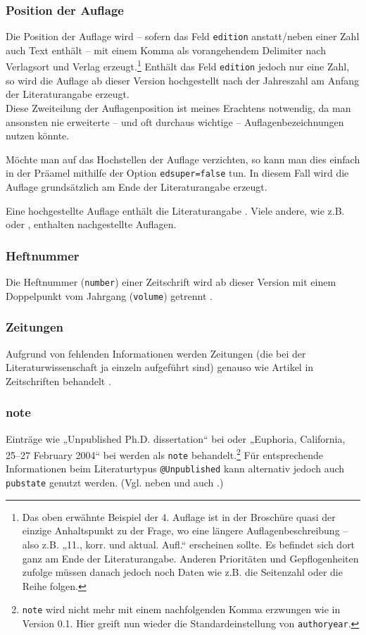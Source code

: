\documentclass[12pt,notitlepage,parskip]{scrartcl}
\begin{document}
\subsubsection{Position der Auflage}
Die Position der Auflage wird – sofern das Feld \texttt{edition} anstatt/neben
einer Zahl auch Text enthält – mit einem Komma als vorangehendem Delimiter nach
Verlagsort und Verlag erzeugt.\footnote{Das oben erwähnte Beispiel der 4.
Auflage ist in der Broschüre quasi der einzige Anhaltspunkt zu der Frage, wo
eine längere Auflagenbeschreibung – also z.B. „11., korr. und aktual. Aufl.“
erscheinen sollte. Es befindet sich dort ganz am Ende der Literaturangabe.
Anderen Prioritäten und Gepflogenheiten zufolge müssen danach jedoch noch Daten
wie z.B. die Seitenzahl oder die Reihe folgen.} Enthält das Feld
\texttt{edition} jedoch nur eine Zahl, so wird die Auflage ab dieser Version
hochgestellt nach der Jahreszahl am Anfang der Literaturangabe erzeugt.\\
Diese Zweiteilung der Auflagenposition ist meines Erachtens notwendig, da man
ansonsten nie erweiterte – und oft durchaus wichtige – Auflagenbezeichnungen
nutzen könnte.

Möchte man auf das Hochstellen der Auflage verzichten, so kann man dies
einfach in der Präamel mithilfe der Option \texttt{edsuper=false} tun. In diesem
Fall wird die Auflage grundsätzlich am Ende der Literaturangabe erzeugt.

Eine hochgestellte Auflage enthält die Literaturangabe \textcite{greule}. Viele
andere, wie z.B. \textcite{nt} oder \textcite{sterne1}, enthalten nachgestellte
Auflagen.

\subsubsection{Heftnummer}
Die Heftnummer (\texttt{number}) einer Zeitschrift wird ab dieser Version mit
einem Doppelpunkt vom Jahrgang (\texttt{volume}) getrennt \parencite[vgl. die
Literaturangabe][]{unselbst-zeitsch2}.

\subsubsection{Zeitungen}
Aufgrund von fehlenden Informationen werden Zeitungen (die bei der
Literaturwissenschaft ja einzeln aufgeführt sind) genauso wie Artikel in
Zeitschriften behandelt \parencite[vgl.][]{unselbst-zeitung}.

\subsubsection{note}
Einträge wie „Unpublished Ph.D. dissertation“ bei \textcite{swallow2} oder
„Euphoria, California, 25–27 February 2004“ bei \textcite{house} werden als
\texttt{note} behandelt.\footnote{\texttt{note} wird nicht mehr mit einem
nachfolgenden Komma erzwungen wie in Version 0.1. Hier greift nun wieder die
Standardeinstellung von \texttt{authoryear}.}
Für entsprechende Informationen beim Literaturtypus \texttt{@Unpublished} kann
alternativ jedoch auch \texttt{pubstate} genutzt werden.
(Vgl. neben \textcite{swallow2} und \textcite{house} auch \textcite{ferra-ma}.)
\end{document}
